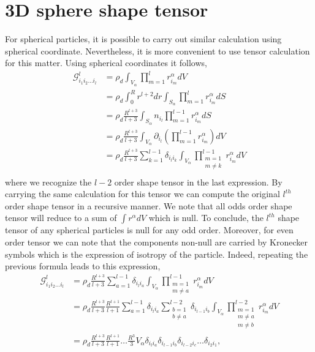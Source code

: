 \section{3D sphere shape tensor}
For spherical particles, it is possible to carry out similar calculation using spherical coordinate. 
Nevertheless, it is more convenient to use tensor calculation for this matter. 
Using spherical coordinates it follows,
\begin{align*}
    \mathcal{G}_{i_1i_2\ldots i_l}^l 
    &= \rho_d \int_{V_\alpha} \prod^l_{m=1}r^\alpha_{i_m} dV\\
    &= \rho_d \int_0^R r^{l+2} dr  
      \int_{S_\alpha} \prod^l_{m=1}r^\alpha_{i_m} dS\\
    &=\rho_d \frac{R^{l+3}}{l+3}
      \int_{S_\alpha}  n_{i_l} \prod^{l-1}_{m=1} r^\alpha_{i_m} dS\\
    &=\rho_d \frac{R^{l+3}}{l+3}
      \int_{V_\alpha}  \partial_{i_l} \left(\prod^{l-1}_{m=1} r^\alpha_{i_m}\right) dV\\
    &=\rho_d \frac{R^{l+3}}{l+3}\sum_{k=1}^{l-1} \delta_{i_l i_k}
      \int_{V_\alpha}  \prod^{l-1}_{\substack{m=1\\ m\neq k}} r^\alpha_{i_m} dV\\
\end{align*}
where we recognize the $l-2$ order shape tensor in the last expression. 
By carrying the same calculation for this tensor we can compute the original $l^{th}$ order shape tensor in a recursive manner. 
We note that all odds order shape tensor will reduce to a sum of $\int r^\alpha dV$ which is null. 
To conclude, the  $l^{th}$ shape tensor of any spherical particles is null for any odd order. 
Moreover, for even order tensor we can note that the components non-null are carried by Kronecker symbols which is the expression of isotropy of the particle. 
Indeed, repeating the previous formula leads to this expression,
\begin{align*}
    \mathcal{G}_{i_1i_2\ldots i_l}^l 
    &=\rho_d \frac{R^{l+3}}{l+3}\sum_{a=1}^{l-1} \delta_{i_l i_a}
      \int_{V_\alpha}  \prod^{l-1}_{\substack{m=1\\ m\neq a}} r^\alpha_{i_m} dV\\
    &=\rho_d \frac{R^{l+3}}{l+3}
    \frac{R^{l+1}}{l+1}\sum_{a=1}^{l-1} \delta_{i_l i_a}
    \sum_{\substack{b=1\\ b\neq a}}^{l-2} \delta_{i_{l-1} i_b}
      \int_{V_\alpha}  \prod^{l-2}_{\substack{m=1\\ m\neq a\\ m\neq b}} r^\alpha_{i_m} dV\\
    &=\rho_d \frac{R^{l+3}}{l+3}
    \frac{R^{l+1}}{l+1} 
    \ldots
    \frac{R^3}{3}
    V_\alpha
    \delta_{i_l i_a}
    \delta_{i_{l-1} i_b}
    \delta_{i_{l-2} i_c}
    \ldots
    \delta_{i_2i_1},
\end{align*}
